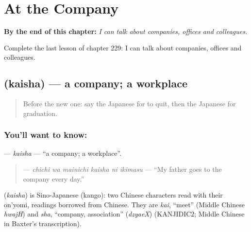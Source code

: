 
\chapter{At the Company}
\label{ch:ja-at-the-company}

\begin{chapteropening}
\textbf{By the end of this chapter:} \emph{I can talk about companies, offices and colleagues.}

Complete the last lesson of chapter 229: I can talk about companies, offices and colleagues.
\end{chapteropening}

\section[\texorpdfstring{\ja{かいしゃ} (kaisha)}{かいしゃ (kaisha)}]{ (kaisha) — a company; a workplace}

\label{lesson:JA-C229-kaisha}



\begin{quote}
Before the new one: say the Japanese for to quit, then the Japanese for graduation.
\end{quote}

\subsection*{You'll want to know: }
\textbf{} — \emph{kaisha} — \textquotedblleft{}a company; a workplace\textquotedblright{}.

\begin{quote}
\textbf{   } — \emph{chichi wa mainichi kaisha ni ikimasu} — \textquotedblleft{}My father goes to the company every day.\textquotedblright{}
\end{quote}

\begin{cousinweb}
\textbf{} (\emph{kaisha}) is Sino-Japanese (kango): two Chinese characters read with their on'yomi, readings borrowed from Chinese. They are \emph{kai}, \textquotedblleft{}meet\textquotedblright{} (Middle Chinese \emph{hwajH}) and \emph{sha}, \textquotedblleft{}company, association\textquotedblright{} (\emph{dzyaeX}) (KANJIDIC2; Middle Chinese in Baxter's transcription).
\end{cousinweb}

